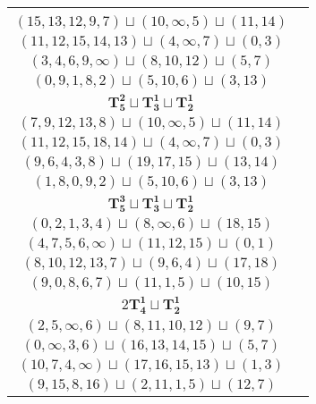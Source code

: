 \documentclass{article}
\begin{document}
\begin{longtable}{|c|c|}
\begin{tabular}{c}
        $(10,13,\infty,8,11)\sqcup(3,2,4)\sqcup(16,15)$ \\ 
        $(15,13,12,9,7)\sqcup(10,\infty,5)\sqcup(11,14)$ \\ 
        $(11,12,15,14,13)\sqcup(4,\infty,7)\sqcup(0,3)$ \\ 
        $(3,4,6,9,\infty)\sqcup(8,10,12)\sqcup(5,7)$ \\ 
        $(0,9,1,8,2)\sqcup(5,10,6)\sqcup(3,13)$
        \end{tabular} \\ 
        \hline
        $\mathbf{T_{5}^{2}} \sqcup \mathbf{T_{3}^{1}} \sqcup \mathbf{T_{2}^{1}}$ & \begin{tabular}{c}
        $(8,\infty,13,10,9)\sqcup(3,2,4)\sqcup(14,15)$ \\ 
        $(7,9,12,13,8)\sqcup(10,\infty,5)\sqcup(11,14)$ \\ 
        $(11,12,15,18,14)\sqcup(4,\infty,7)\sqcup(0,3)$ \\ 
        $(9,6,4,3,8)\sqcup(19,17,15)\sqcup(13,14)$ \\ 
        $(1,8,0,9,2)\sqcup(5,10,6)\sqcup(3,13)$
        \end{tabular} \\ 
        \hline
        $\mathbf{T_{5}^{3}} \sqcup \mathbf{T_{3}^{1}} \sqcup \mathbf{T_{2}^{1}}$ & \begin{tabular}{c}
        $(2,\infty,3,4,5)\sqcup(12,13,15)\sqcup(16,19)$ \\ 
        $(0,2,1,3,4)\sqcup(8,\infty,6)\sqcup(18,15)$ \\ 
        $(4,7,5,6,\infty)\sqcup(11,12,15)\sqcup(0,1)$ \\ 
        $(8,10,12,13,7)\sqcup(9,6,4)\sqcup(17,18)$ \\ 
        $(9,0,8,6,7)\sqcup(11,1,5)\sqcup(10,15)$
        \end{tabular} \\ 
        \hline
        $2\mathbf{T_{4}^{1}} \sqcup \mathbf{T_{2}^{1}}$ & \begin{tabular}{c}
        $(1,\infty,16,18)\sqcup(11,13,12,15)\sqcup(4,5)$ \\ 
        $(2,5,\infty,6)\sqcup(8,11,10,12)\sqcup(9,7)$ \\ 
        $(0,\infty,3,6)\sqcup(16,13,14,15)\sqcup(5,7)$ \\ 
        $(10,7,4,\infty)\sqcup(17,16,15,13)\sqcup(1,3)$ \\ 
        $(9,15,8,16)\sqcup(2,11,1,5)\sqcup(12,7)$
        \end{tabular} \\ 

\end{longtable}
\end{document}
